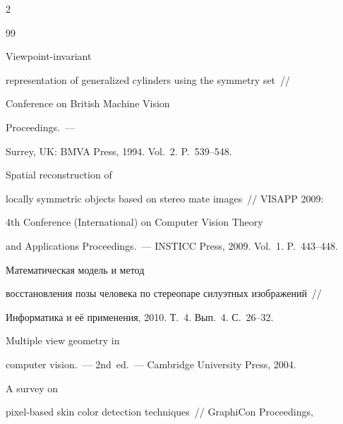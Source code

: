 \begin{multicols}{2}
{{\begin{thebibliography}{99}


 Viewpoint-invariant


  representation of generalized cylinders using the symmetry set~//


  Conference on British Machine Vision\linebreak\vspace*{-12pt}


  \pagebreak


  


  \noindent


  Proceedings.~---


Surrey, UK: BMVA Press, 1994.  Vol.~2.  P.~539--548.







 Spatial reconstruction of


  locally symmetric objects based on stereo mate images~// VISAPP 2009:


  4th Conference (International)  on Computer Vision Theory


  and Applications Proceedings.~---  INSTICC Press, 2009.  Vol.~1.  P.~443--448.







 Математическая модель и метод


  восстановления позы человека по стереопаре силуэтных изображений~//


  Информатика и её применения, 2010. Т.~4. Вып.~4. С.~26--32.







 Multiple view geometry in


computer vision.~--- 2nd~ed.~--- Cambridge University Press, 2004.







 A survey on


  pixel-based skin color detection techniques~//  GraphiCon Proceedings,



\end{thebibliography}}}
\end{multicols}
